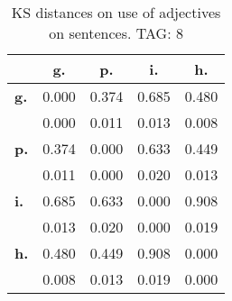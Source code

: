 \begin{table}[h!]
\begin{center}
\begin{tabular}{| l || c | c | c | c |}\hline
 & {\bf g.} & {\bf p.} & {\bf i.} & {\bf h.} \\\hline\hline
{\bf g.} & 0.000 & 0.374 & 0.685 & 0.480 \\
{\bf } & 0.000 & 0.011 & 0.013 & 0.008 \\\hline
{\bf p.} & 0.374 & 0.000 & 0.633 & 0.449 \\
{\bf } & 0.011 & 0.000 & 0.020 & 0.013 \\\hline
{\bf i.} & 0.685 & 0.633 & 0.000 & 0.908 \\
{\bf } & 0.013 & 0.020 & 0.000 & 0.019 \\\hline
{\bf h.} & 0.480 & 0.449 & 0.908 & 0.000 \\
{\bf } & 0.008 & 0.013 & 0.019 & 0.000 \\\hline
\end{tabular}
\caption{KS distances on use of adjectives on sentences. TAG: 8}
\end{center}
\end{table}